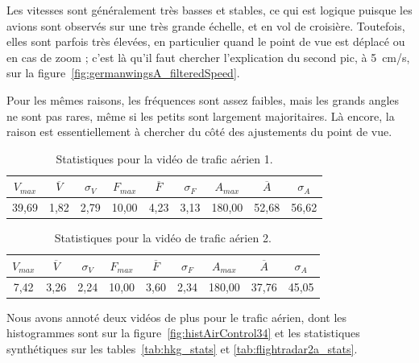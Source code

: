 	Les vitesses sont généralement très basses et stables, ce qui est logique puisque les avions sont observés sur une très grande échelle, et en vol de croisière. Toutefois, elles sont parfois très élevées, en particulier quand le point de vue est déplacé ou en cas de zoom ; c'est là qu'il faut chercher l'explication du second pic, à 5~cm/s, sur la figure~\ref{fig:germanwingsA_filteredSpeed}.
	
	Pour les mêmes raisons, les fréquences sont assez faibles, mais les grands angles ne sont pas rares, même si les petits sont largement majoritaires. Là encore, la raison est essentiellement à chercher du côté des ajustements du point de vue.
	
\begin{table}
	\centering
	\begin{tabular}{c c c c c c c c c}
		$V_{max}$	& $\overline{V}$	& $\sigma_{V}$	& $F_{max}$	& $\overline{F}$	& $\sigma_{F}$	& $A_{max}$	& $\overline{A}$	& $\sigma_{A}$	\bigstrut[b] \\ \hline

		39,69		& 1,82				& 2,79			& 10,00		& 4,23				& 3,13			& 180,00	& 52,68				& 56,62			\bigstrut[t] \\
	\end{tabular}
	\caption[Statistiques pour la vidéo de trafic aérien 1]{Statistiques pour la vidéo de trafic aérien 1.}
	\label{tab:mhA_stats}
\end{table}

\begin{table}
	\centering
	\begin{tabular}{c c c c c c c c c}
		$V_{max}$	& $\overline{V}$	& $\sigma_{V}$	& $F_{max}$	& $\overline{F}$	& $\sigma_{F}$	& $A_{max}$	& $\overline{A}$	& $\sigma_{A}$	\bigstrut[b] \\ \hline

		7,42		& 3,26				& 2,24			& 10,00		& 3,60				& 2,34			& 180,00	& 37,76				& 45,05			\bigstrut[t] \\
	\end{tabular}
	\caption[Statistiques pour la vidéo de trafic aérien 2]{Statistiques pour la vidéo de trafic aérien 2.}
	\label{tab:germanwingsA_stats}
\end{table}

	Nous avons annoté deux vidéos de plus pour le trafic aérien, dont les histogrammes sont sur la figure~\ref{fig:histAirControl34} et les statistiques synthétiques sur les tables~\ref{tab:hkg_stats} et \ref{tab:flightradar2a_stats}.
	
